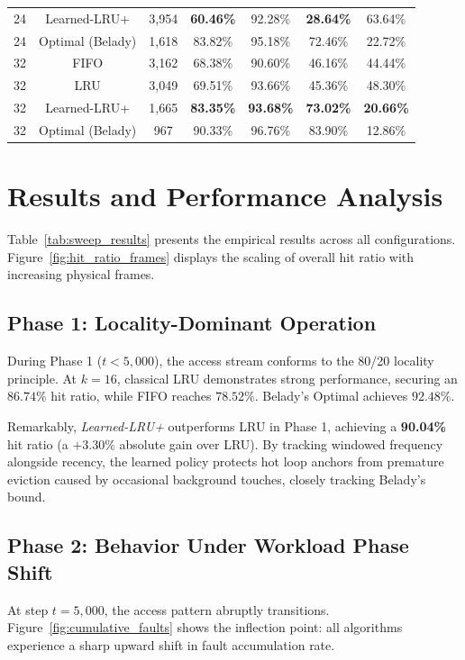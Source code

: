 \documentclass[10pt,twocolumn,a4paper]{article}
\begin{document}
\begin{table}[t]
\begin{tabular}{ccccccc}
24 & Learned-LRU+     & 3,954 & \textbf{60.46\%} & 92.28\% & \textbf{28.64\%} & 63.64\% \\
24 & Optimal (Belady) & 1,618 & 83.82\% & 95.18\% & 72.46\% & 22.72\% \\
\midrule
32 & FIFO             & 3,162 & 68.38\% & 90.60\% & 46.16\% & 44.44\% \\
32 & LRU              & 3,049 & 69.51\% & 93.66\% & 45.36\% & 48.30\% \\
32 & Learned-LRU+     & 1,665 & \textbf{83.35\%} & \textbf{93.68\%} & \textbf{73.02\%} & \textbf{20.66\%} \\
32 & Optimal (Belady) & 967   & 90.33\% & 96.76\% & 83.90\% & 12.86\% \\
\bottomrule
\end{tabular}
\end{table}

\section{Results and Performance Analysis}

Table~\ref{tab:sweep_results} presents the empirical results across all configurations. Figure~\ref{fig:hit_ratio_frames} displays the scaling of overall hit ratio with increasing physical frames.

\subsection{Phase 1: Locality-Dominant Operation}
During Phase 1 ($t < 5{,}000$), the access stream conforms to the 80/20 locality principle. At $k = 16$, classical LRU demonstrates strong performance, securing an $86.74\%$ hit ratio, while FIFO reaches $78.52\%$. Belady's Optimal achieves $92.48\%$. 

Remarkably, \textit{Learned-LRU+} outperforms LRU in Phase 1, achieving a \textbf{90.04\%} hit ratio (a $+3.30\%$ absolute gain over LRU). By tracking windowed frequency alongside recency, the learned policy protects hot loop anchors from premature eviction caused by occasional background touches, closely tracking Belady's bound.

\subsection{Phase 2: Behavior Under Workload Phase Shift}
At step $t = 5{,}000$, the access pattern abruptly transitions. Figure~\ref{fig:cumulative_faults} shows the inflection point: all algorithms experience a sharp upward shift in fault accumulation rate.
\end{document}

